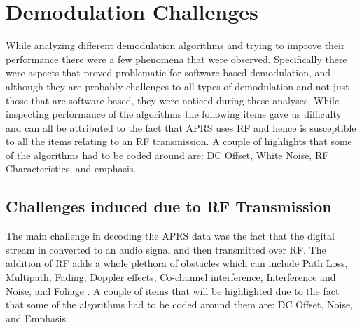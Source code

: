 \chapter{Demodulation Challenges}
While analyzing different demodulation algorithms and trying to improve their performance there were a few phenomena that were observed. Specifically there were aspects that proved problematic for software based demodulation, and although they are probably challenges to all types of demodulation and not just those that are software based, they were noticed during these analyses. While inspecting performance of the algorithms the following items gave us difficulty and can all be attributed to the fact that APRS uses RF and hence is susceptible to all the items relating to an RF transmission. A couple of highlights that some of the algorithms had to be coded around are: DC Offset, White Noise, RF Characteristics, and emphasis.

\section{Challenges induced due to RF Transmission}
The main challenge in decoding the APRS data was the fact that the digital stream in converted to an audio signal and then transmitted over RF. The addition of RF adds a whole plethora of obstacles which can include Path Loss, Multipath, Fading, Doppler effects, Co-channel interference, Interference and Noise, and Foliage \cite{Goleniewski2006}. A couple of items that will be highlighted due to the fact that some of the algorithms had to be coded around them are: DC Offset, Noise, and Emphasis.

